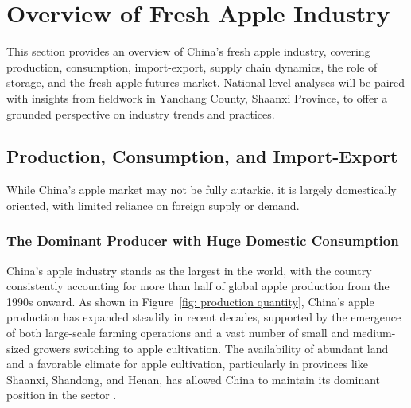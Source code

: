 
\newpage
\section{Overview of Fresh Apple Industry}
\noindent This section provides an overview of China's fresh apple industry, covering production, consumption, import-export, supply chain dynamics, the role of storage, and the fresh-apple futures market. National-level analyses will be paired with insights from fieldwork in Yanchang County, Shaanxi Province, to offer a grounded perspective on industry trends and practices.

\subsection{Production, Consumption, and Import-Export}
\noindent While China's apple market may not be fully autarkic, it is largely domestically oriented, with limited reliance on foreign supply or demand.

\subsubsection{The Dominant Producer with Huge Domestic Consumption}
\noindent China's apple industry stands as the largest in the world, with the country consistently accounting for more than half of global apple production from the 1990s onward. As shown in Figure~\ref{fig: production quantity}, China's apple production has expanded steadily in recent decades, supported by the emergence of both large-scale farming operations and a vast number of small and medium-sized growers switching to apple cultivation. The availability of abundant land and a favorable climate for apple cultivation, particularly in provinces like Shaanxi, Shandong, and Henan, has allowed China to maintain its dominant position in the sector \citep{sun2021production}.


